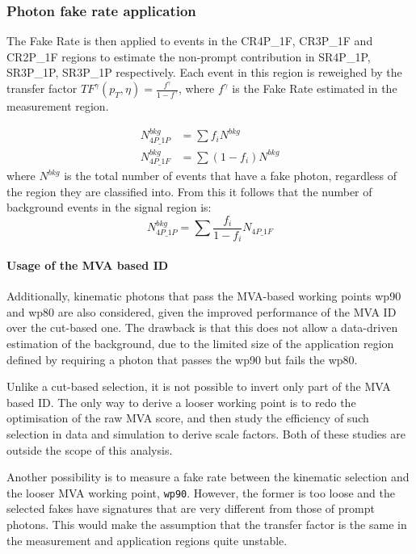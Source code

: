\subsubsection{Photon fake rate application}
The Fake Rate is then applied to events in the CR4P\_1F, CR3P\_1F and CR2P\_1F regions to estimate the non-prompt contribution in SR4P\_1P, SR3P\_1P, SR3P\_1P respectively.
Each event in this region is reweighed by the transfer factor $TF^\gamma(p_T, \eta) = \frac{f^\gamma}{1-f^\gamma}$, where $f^\gamma$ is the Fake Rate estimated in the measurement region.

\begin{equation}
  \begin{split}
    \label{eq:fakeRate_explanation_part1}
    N^{bkg}_{4P\_1P} &= \sum f_i N^{bkg}
    \\
    N^{bkg}_{4P\_1F} &= \sum ( 1-f_i ) N^{bkg}
  \end{split}
\end{equation}
where $N^{bkg}$ is the total number of events that have a fake photon, regardless of the region they are classified into.
From this it follows that the number of background events in the signal region is:
\begin{equation}
  \label{eq:fakeRate_explanation_part2}
  N^{bkg}_{4P\_1P} = \sum \frac{f_i}{1-f_i} N_{4P\_1F}
\end{equation}

\paragraph{Usage of the MVA based ID\\}
Additionally, kinematic photons that pass the MVA-based working points wp90 and wp80 are also considered,
given the improved performance of the MVA ID over the cut-based one.
The drawback is that this does not allow a data-driven estimation of the \nonprompt background,
due to the limited size of the application region defined by requiring a photon that passes the wp90 but fails the wp80.

Unlike a cut-based selection, it is not possible to invert only part of the MVA based ID.
The only way to derive a looser working point is to redo the optimisation of the raw MVA score,
and then study the efficiency of such selection in data and simulation to derive scale factors.
Both of these studies are outside the scope of this analysis.

Another possibility is to measure a fake rate between the kinematic selection and the looser MVA working point, \texttt{wp90}.
However, the former is too loose and the selected fakes have signatures that are very different from those of prompt photons.
This would make the assumption that the transfer factor is the same in the measurement and application regions quite unstable.

